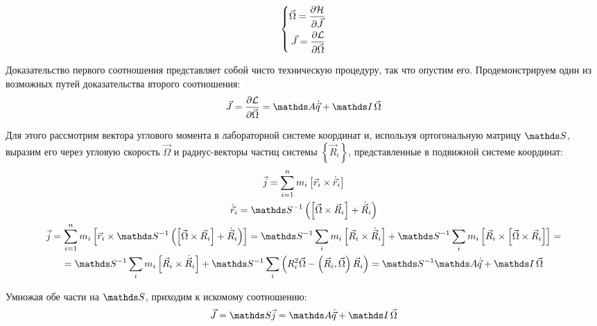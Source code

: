 \vverh
\begin{gather}
\left\{
\begin{aligned}
\vec{\Omega} = \frac{\partial \mathcal{H}}{\partial \vec{J}} \\ 
\vec{J} = \frac{\partial \mathcal{L}}{\partial \vec{\Omega}}
\end{aligned}
\right. \notag
\end{gather}

Доказательство первого соотношения представляет собой чисто техническую процедуру, так что опустим его. Продемонстрируем один из возможных путей доказательства второго соотношения:
\vverh
\begin{gather}
\vec{J} = \frac{\partial \mathcal{L}}{\partial \vec{\Omega}} = \bbA \dot{\vec{q}} + \bbI \, \vec{\Omega} \notag
\end{gather}

Для этого рассмотрим вектора углового момента в лабораторной системе координат и, используя ортогональную матрицу $\bbS$, выразим его через угловую скорость $\vec{\Omega}$ и радиус-векторы частиц системы $\left\{ \vec{R}_i \right\}$, представленные в подвижной системе координат:
\vverh
\begin{gather}
\vec{j} = \sum_{i=1}^{n} m_i \left[ \vec{r}_i \times \dot{\vec{r}}_i \right] \notag \\
\dot{\vec{r}}_i = \bbS^{-1} \lb \left[ \vec{\Omega} \times \vec{R}_i \right] + \dot{\vec{R}}_i \rb \notag \\
\vec{j} = \sum_{i=1}^{n} m_i \left[ \vec{r}_i \times \bbS^{-1} \lb \left[ \vec{\Omega} \times \vec{R}_i \right] + \dot{\vec{R}}_i \rb \right] =
\bbS^{-1} \sum_i m_i \left[ \vec{R}_i \times \dot{\vec{R}}_i \right] + \bbS^{-1} \sum_i m_i \left[ \vec{R}_i \times \left[ \vec{\Omega} \times \vec{R}_i \right] \right] = \notag \\
= \bbS^{-1} \sum_i m_i \left[ \vec{R}_i \times \dot{\vec{R}}_i \right] + \bbS^{-1} \sum_i \lb R_i^2 \vec{\Omega} - \lb \vec{R}_i , \vec{\Omega} \rb \vec{R}_i \rb = \bbS^{-1} \bbA \dot{\vec{q}} + \bbI \, \vec{\Omega} \notag
\end{gather}

Умножая обе части на $\bbS$, приходим к искомому соотношению: 
\begin{gather}
\vec{J} = \bbS \vec{j} = \bbA \dot{\vec{q}} + \bbI \, \vec{\Omega} \notag 
\end{gather}